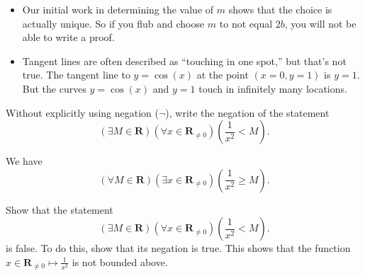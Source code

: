 \documentclass[12pt,fleqn,answers]{exam}
\newcommand{\reals}{\mathbf{R}}
\renewenvironment{solution}
  {\begin{shaded*}} %
  {\end{shaded*}}   %
\begin{document}
\begin{questions}
\begin{solution}
\begin{itemize}
\item Our initial work in determining the value of $m$ shows that the
choice is actually unique. So if you flub and choose $m$ to not equal 
$2 b$, you will not be able to write a proof.

\item Tangent lines are often described as ``touching in one spot,''
but that's not true. The tangent line to $y=\cos(x)$ at the point 
$(x=0,y=1)$ is $y = 1$. But the curves $y=\cos(x)$ and $y=1$ touch in
infinitely many locations.

\end{itemize}
 \end{solution}
 
\question [10] Without explicitly using negation ($\lnot$), write the negation of the statement
\begin{equation*}
  \left(\exists M \in \reals\right)
  \left(\forall x \in \reals_{\neq 0} \right)
  \left(\frac{1}{x^2} < M \right).
\end{equation*}

\begin{solution} We have
  \begin{equation*}
    \left(\forall M \in \reals\right)
    \left(\exists x \in \reals_{\neq 0} \right)
    \left(\frac{1}{x^2} \geq  M \right).
  \end{equation*}
\end{solution}

\question[10] Show that the statement 
\begin{equation*}
  \left(\exists M \in \reals\right)
  \left(\forall x \in \reals_{\neq 0} \right)
  \left(\frac{1}{x^2} < M \right).
\end{equation*} 
is false. To do this, show that its negation is true. This shows that the function $x \in \reals_{\neq 0} \mapsto \frac{1}{x^2}$ is
not bounded above.


\end{questions}
\end{document}
